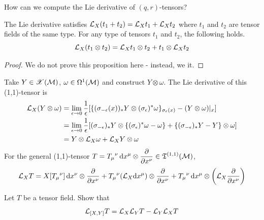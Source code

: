 \documentclass[a4paper, 10pt]{article}
\begin{document}
\seprule

How can we compute the Lie derivative of  $(q,r)$-tensors?

\begin{prop}
    The Lie derivative satisfies $\mathcal{L}_{X}(t_{1} + t_{2}) = \mathcal{L}_{X}t_{1} + \mathcal{L}_{X}t_{2}$ where $t_{1}$ and $t_{2}$ are tensor fields of the same type. For any type of tensors $t_{1}$ and $t_{2}$, the following holds.
    \[ \mathcal{L}_{X}(t_{1} \otimes t_{2}) = \mathcal{L}_{X}t_{1} \otimes t_{2} + t_{1} \otimes \mathcal{L}_{X}t_{2} \]
\end{prop}

\begin{proof}
    We do not prove this proposition here - instead, we  it.
\end{proof}
\newpage


\begin{example}
    Take $Y \in \mathscr{X}(\mathcal{M})$, $\omega \in \Omega^{1}(\mathcal{M})$ and construct $Y \otimes \omega$. The Lie derivative of this (1,1)-tensor is
    \begin{align*}
        \mathcal{L}_{X}(Y \otimes \omega) &= \lim_{\epsilon\rightarrow 0}\frac{1}{\epsilon}[\{(\sigma_{-\epsilon}(x))_{\ast}Y \otimes (\sigma_{\epsilon})^{\ast}\omega\}_{\sigma_{\epsilon}(x)} - (Y \otimes \omega)|_{x}] \\
        &= \lim_{\epsilon\rightarrow 0}\frac{1}{\epsilon}[(\sigma_{-\epsilon})_{\ast}Y \otimes \{ (\sigma_{\epsilon})^{\ast}\omega - \omega \} + \{ (\sigma_{-\epsilon})_{\ast}Y - Y \} \otimes \omega] \\
        &= Y \otimes \mathcal{L}_{X}\omega + \mathcal{L}_{X}Y \otimes \omega
    \end{align*}
    For the general (1,1)-tensor $\displaystyle{ T = T_{\mu}{}^{\nu}\,\mathrm{d}{x}^{\mu}\otimes\frac{\partial}{\partial x^{\nu}} \in \mathfrak{T}^{(1,1)}(\mathcal{M}) }$,
    \[ \mathcal{L}_{X}T = X[T_{\mu}{}^{\nu}]\,\mathrm{d}{x}^{\nu}\otimes\frac{\partial}{\partial x^{\nu}} + T_{\mu}{}^{\nu}(\mathcal{L}_{X}\mathrm{d}{x}^{\mu})\otimes\frac{\partial}{\partial x^{\nu}} + T_{\mu}{}^{\nu} \,\mathrm{d}{x}^{\mu}\otimes\left(\mathcal{L}_{X}\frac{\partial}{\partial x^{\nu}}\right) \]
\end{example}

\begin{exer}
    Let $T$ be a tensor field. Show that
    \[ \mathcal{L}_{[X, Y]}T = \mathcal{L}_{X}\mathcal{L}_{Y}T - \mathcal{L}_{Y}\mathcal{L}_{X}T \]
\end{exer}
\end{document}
